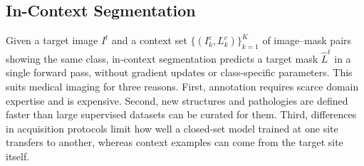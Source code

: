 \subsection{In-Context Segmentation}\label{sec:fundamentals-icl}

Given a target image $I^t$ and a context set
$\{(I^c_k, L^c_k)\}_{k=1}^{K}$ of image--mask pairs showing the same class,
in-context segmentation predicts a target mask $\hat{L}^t$ in a single forward
pass, without gradient updates or class-specific parameters. This suits medical imaging for three reasons. First, annotation requires
scarce domain expertise and is expensive. Second, new structures and
pathologies are defined faster than large supervised datasets can be curated
for them. Third, differences in acquisition protocols limit how well a
closed-set model trained at one site transfers to another, whereas context
examples can come from the target site itself.
